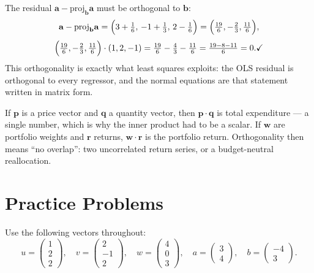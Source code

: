 \begin{worked}
The residual $\mathbf a-\mathrm{proj}_{\mathbf b}\mathbf a$ must be
orthogonal to $\mathbf b$:
\[
  \mathbf a-\mathrm{proj}_{\mathbf b}\mathbf a
  =\Bigl(3+\tfrac16,\,-1+\tfrac13,\,2-\tfrac16\Bigr)
  =\Bigl(\tfrac{19}{6},-\tfrac23,\tfrac{11}{6}\Bigr),
\]
\[
  \Bigl(\tfrac{19}{6},-\tfrac23,\tfrac{11}{6}\Bigr)\cdot(1,2,-1)
  =\tfrac{19}{6}-\tfrac43-\tfrac{11}{6}
  =\tfrac{19-8-11}{6}=0 . \checkmark
\]
This orthogonality is exactly what least squares exploits: the OLS residual
is orthogonal to every regressor, and the normal equations are that
statement written in matrix form.

If $\mathbf p$ is a price vector and $\mathbf q$ a quantity vector, then
$\mathbf p\cdot\mathbf q$ is total expenditure --- a single number, which is
why the inner product had to be a scalar. If $\mathbf w$ are portfolio
weights and $\mathbf r$ returns, $\mathbf w\cdot\mathbf r$ is the portfolio
return. Orthogonality then means ``no overlap'': two uncorrelated return
series, or a budget-neutral reallocation.
\end{worked}

\section{Practice Problems}

Use the following vectors throughout:
\[
u = \begin{pmatrix} 1 \\ 2 \\ 2 \end{pmatrix}, \quad
v = \begin{pmatrix} 2 \\ -1 \\ 2 \end{pmatrix}, \quad
w = \begin{pmatrix} 4 \\ 0 \\ 3 \end{pmatrix}, \quad
a = \begin{pmatrix} 3 \\ 4 \end{pmatrix}, \quad
b = \begin{pmatrix} -4 \\ 3 \end{pmatrix}.
\]

